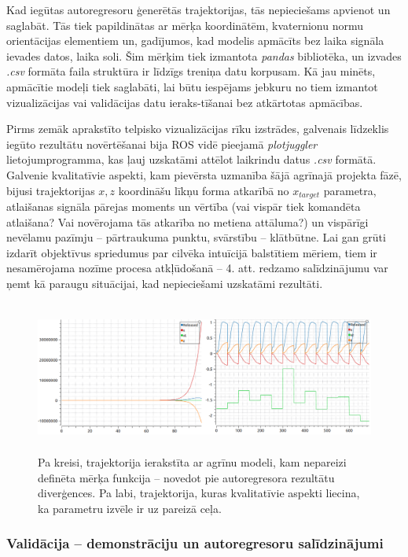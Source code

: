 \documentclass[12pt, a4paper]{article}
\numberwithin{equation}{section} %
\begin{document}
Kad iegūtas autoregresoru ģenerētās trajektorijas, tās nepieciešams apvienot un saglabāt. Tās tiek papildinātas ar mērķa koordinātēm, kvaternionu normu orientācijas elementiem un, gadījumos, kad modelis apmācīts bez laika signāla ievades datos, laika soli.  Šim mērķim tiek izmantota \textit{pandas} bibliotēka, un izvades \textit{.csv} formāta faila struktūra ir līdzīgs treniņa datu korpusam. Kā jau minēts, apmācītie modeļi tiek saglabāti, lai būtu iespējams jebkuru no tiem izmantot vizualizācijas vai validācijas datu ieraks-tīšanai bez atkārtotas apmācības. 

Pirms zemāk aprakstīto telpisko vizualizācijas rīku izstrādes, galvenais līdzeklis iegūto rezultātu novērtēšanai bija ROS vidē pieejamā \textit{plotjuggler} lietojumprogramma, kas ļauj uzskatāmi attēlot laikrindu datus \textit{.csv} formātā. Galvenie kvalitatīvie aspekti, kam pievērsta uzmanība šājā agrīnajā projekta fāzē, bijusi trajektorijas $x, z$ koordināšu līkņu forma atkarībā no $x_{target}$ parametra, atlaišanas signāla pārejas moments un vērtība (vai vispār tiek komandēta atlaišana? Vai novērojama tās atkarība no metiena attāluma?) un vispārīgi nevēlamu pazīmju -- pārtraukuma punktu, svārstību -- klātbūtne. Lai gan grūti izdarīt objektīvus spriedumus par cilvēka intuīcijā balstītiem mēriem, tiem ir nesamērojama nozīme procesa atkļūdošanā -- 4. att. redzamo salīdzinājumu var ņemt kā paraugu situācijai, kad nepieciešami uzskatāmi rezultāti.

\begin{figure}[t!]
    \centering
    \includegraphics[height=5cm,page=1]{../img/qualitative_plots.png}
    \caption{Pa kreisi, trajektorija ierakstīta ar agrīnu modeli, kam nepareizi definēta mērķa funkcija -- novedot pie autoregresora rezultātu diverģences. Pa labi, trajektorija, kuras kvalitatīvie aspekti liecina, ka parametru izvēle ir uz pareizā ceļa.}
\end{figure}

\subsubsection{Validācija -- demonstrāciju un autoregresoru salīdzinājumi}
\end{document}
